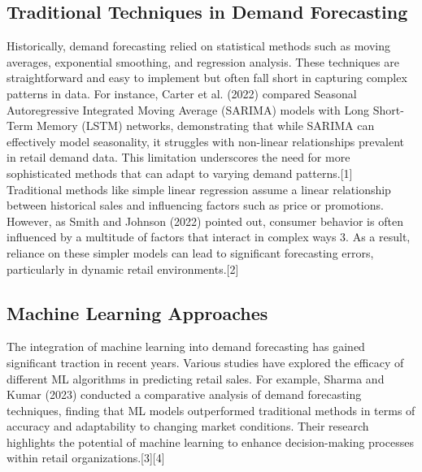 \documentclass[10pt]{report}
\begin{document}
\begin{center}
\subsection{Traditional Techniques in Demand Forecasting}\label{AA}
Historically, demand forecasting relied on statistical methods such as moving averages, exponential smoothing, and regression analysis. These techniques are straightforward and easy to implement but often fall short in capturing complex patterns in data. For instance, Carter et al. (2022) compared Seasonal Autoregressive Integrated Moving Average (SARIMA) models with Long Short-Term Memory (LSTM) networks, demonstrating that while SARIMA can effectively model seasonality, it struggles with non-linear relationships prevalent in retail demand data. This limitation underscores the need for more sophisticated methods that can adapt to varying demand patterns.[1]\\
Traditional methods like simple linear regression assume a linear relationship between historical sales and influencing factors such as price or promotions. However, as Smith and Johnson (2022) pointed out, consumer behavior is often influenced by a multitude of factors that interact in complex ways 3. As a result, reliance on these simpler models can lead to significant forecasting errors, particularly in dynamic retail environments.[2]
\subsection{Machine Learning Approaches}\label{AA}
The integration of machine learning into demand forecasting has gained significant traction in recent years. Various studies have explored the efficacy of different ML algorithms in predicting retail sales. For example, Sharma and Kumar (2023) conducted a comparative analysis of demand forecasting techniques, finding that ML models outperformed traditional methods in terms of accuracy and adaptability to changing market conditions. Their research highlights the potential of machine learning to enhance decision-making processes within retail organizations.[3][4]

\end{center}
\end{document}
